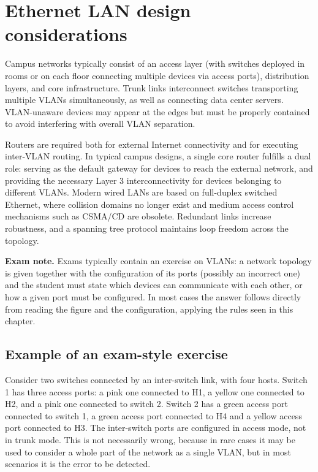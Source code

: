 \section{Ethernet LAN design considerations}

Campus networks typically consist of an access layer (with switches deployed in rooms or on each floor connecting multiple devices via access ports), distribution layers, and core infrastructure. Trunk links interconnect switches transporting multiple VLANs simultaneously, as well as connecting data center servers. VLAN-unaware devices may appear at the edges but must be properly contained to avoid interfering with overall VLAN separation.

\begin{center}
\end{center}

Routers are required both for external Internet connectivity and for executing inter-VLAN routing. In typical campus designs, a single core router fulfills a dual role: serving as the default gateway for devices to reach the external network, and providing the necessary Layer 3 interconnectivity for devices belonging to different VLANs. Modern wired LANs are based on full-duplex switched Ethernet, where collision domains no longer exist and medium access control mechanisms such as CSMA/CD are obsolete. Redundant links increase robustness, and a spanning tree protocol maintains loop freedom across the topology.

\begin{notebox}
	\textbf{Exam note.} Exams typically contain an exercise on VLANs: a network topology is given together with the configuration of its ports (possibly an incorrect one) and the student must state which devices can communicate with each other, or how a given port must be configured. In most cases the answer follows directly from reading the figure and the configuration, applying the rules seen in this chapter.
\end{notebox}

\subsection{Example of an exam-style exercise}
Consider two switches connected by an inter-switch link, with four hosts. Switch 1 has three access ports: a pink one connected to H1, a yellow one connected to H2, and a pink one connected to switch 2. Switch 2 has a green access port connected to switch 1, a green access port connected to H4 and a yellow access port connected to H3. The inter-switch ports are configured in access mode, not in trunk mode. This is not necessarily wrong, because in rare cases it may be used to consider a whole part of the network as a single VLAN, but in most scenarios it is the error to be detected.


